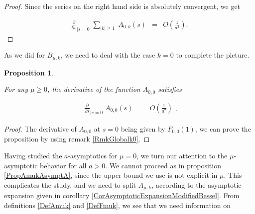 \documentclass{jams-l}
\newtheorem{proposition}[theorem]{Proposition}
\theoremstyle{definition}
\theoremstyle{remark}
\numberwithin{equation}{section}
\begin{document}
\begin{proof}
                \noindent Since the series on the right hand side is absolutely convergent, we get
            
                \[ \begin{array}{lll}
                        \frac{\partial}{\partial s}_{\vert s = 0} \; \sum\limits_{\left \vert k \right \vert \geqslant 1} \; A_{0,k} \left( s \right) & = & O \left( \frac{1}{a^2} \right).
                    \end{array} \]
            
            \end{proof}
            
            As we did for $B_{\mu,k}$, we need to deal with the case $k = 0$ to complete the picture.
            
            \begin{proposition}
            \label{PropAmukAsymptA-0}
        
                For any $\mu \geqslant 0$, the derivative of the function $A_{0,0}$ satisfies
            
                \[ \begin{array}{lll}
                        \displaystyle \frac{\partial}{\partial s}_{\vert s = 0} \; A_{0,0} \left( s \right) & = & \displaystyle O \left( \frac{1}{a^2} \right)
                    \end{array} . \]
        
            \end{proposition}
            
            \begin{proof}
        
                The derivative of $A_{0,0}$ at $s=0$ being given by $F_{0,0} \left( 1 \right)$, we can prove the proposition by using remark \ref{RmkGlobalk0}.
        
        \end{proof}
        
        Having studied the $a$-asymptotics for $\mu = 0$, we turn our attention to the $\mu$-asymptotic behavior for all $a > 0$. We cannot proceed as in proposition \ref{PropAmukAsymptA}, since the upper-bound we use is not explicit in $\mu$. This complicates the study, and we need to split $A_{\mu,k}$, according to the asymptotic expansion given in corollary \ref{CorAsymptoticExpansionModifiedBessel}. From definitions \ref{DefAmuk} and \ref{DefFmuk}, we see that we need information on
        
\end{document}
